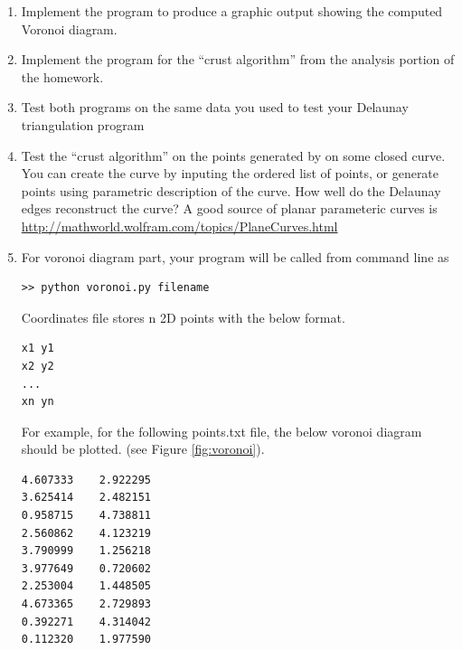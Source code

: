 \documentclass[11pt]{article}
\begin{document}
\begin{enumerate}
\begin{enumerate}

\item 
Implement the program to produce a graphic output showing the computed Voronoi diagram.

\item 
Implement the program for the ``crust algorithm'' from the analysis portion 
of the homework.

\item
Test both programs on the same data you used to test your Delaunay triangulation program

\item
Test the ``crust algorithm'' on the points generated by on some closed curve.
You can create the curve by inputing the ordered list of points,  or generate 
points using parametric description of the curve.  How well do the Delaunay edges 
reconstruct the curve? A good source of planar parameteric curves is 
\href{http://mathworld.wolfram.com/topics/PlaneCurves.html}{http://mathworld.wolfram.com/topics/PlaneCurves.html}

\item
For voronoi diagram part, your program will be called from command line as
\begin{lstlisting}
>> python voronoi.py filename
\end{lstlisting}

Coordinates file stores n 2D points with the below format.

\begin{lstlisting}
x1 y1
x2 y2
...
xn yn
\end{lstlisting}

For example, for the following points.txt file, 
the below voronoi diagram should be plotted. (see Figure \ref{fig:voronoi}).

\begin{lstlisting}
4.607333	2.922295
3.625414	2.482151
0.958715	4.738811
2.560862	4.123219
3.790999	1.256218
3.977649	0.720602
2.253004	1.448505
4.673365	2.729893
0.392271	4.314042
0.112320	1.977590
\end{lstlisting}


\end{enumerate}
\end{enumerate}
\end{document}

